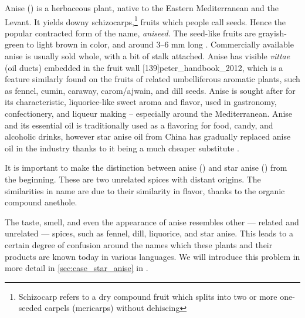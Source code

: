 

Anise () is a herbaceous plant, native to the Eastern Mediterranean and the Levant. It yields downy schizocarps,\footnote{Schizocarp refers to a dry compound fruit which splits into two or more one-seeded carpels (mericarps) without dehiscing} fruits which people call seeds. Hence the popular contracted form of the name, \textit{aniseed}. The seed-like fruits are grayish-green to light brown in color, and around 3--6 mm long \autocite[212]{van_wyk_culinary_2014}. Commercially available anise is usually sold whole, with a bit of stalk attached. Anise has visible \textit{vittae} (oil ducts) embedded in the fruit wall [139]{peter_handbook_2012}, which is a feature similarly found on the fruits of related umbelliferous aromatic plants, such as fennel, cumin, caraway, carom/ajwain, and dill seeds.
Anise is sought after for its characteristic, liquorice-like sweet aroma and flavor, used in gastronomy, confectionery, and liqueur making -- especially around the Mediterranean. 
Anise and its essential oil is traditionally used as a flavoring for food, candy, and alcoholic drinks, however star anise oil from China has gradually replaced anise oil in the industry thanks to it being a much cheaper substitute \autocite[212]{van_wyk_culinary_2014}. %


\begin{note}
It is important to make the distinction between anise () and star anise () from the beginning. These are two unrelated spices with distant origins. The similarities in name are due to their similarity in flavor, thanks to the organic compound anethole. 
\end{note}

The taste, smell, and even the appearance of anise resembles other --- related and unrelated --- spices, such as fennel, dill, liquorice, and star anise. This leads to a certain degree of confusion around the names which these plants and their products are known today in various languages. We will introduce this problem in more detail in \cref{sec:case_star_anise} in .

